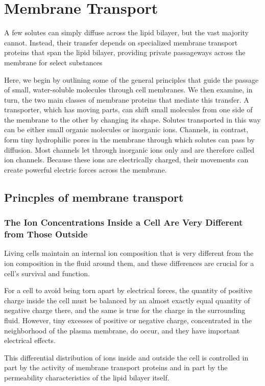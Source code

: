 \chapter{Membrane Transport}

A few solutes can simply diffuse across the lipid bilayer, but
the vast majority cannot. Instead, their transfer depends on specialized
membrane transport proteins that span the lipid bilayer, providing
private passageways across the membrane for select substances

Here, we begin by outlining some of the general principles that guide the passage
of small, water-soluble molecules through cell membranes. We then
examine, in turn, the two main classes of membrane proteins that mediate
this transfer. A transporter, which has moving parts, can shift small
molecules from one side of the membrane to the other by changing its
shape. Solutes transported in this way can be either small organic molecules
or inorganic ions. Channels, in contrast, form tiny hydrophilic pores
in the membrane through which solutes can pass by diffusion. Most channels
let through inorganic ions only and are therefore called ion channels.
Because these ions are electrically charged, their movements can create
powerful electric forces across the membrane.

\section{Princples of membrane transport}

\subsection{The Ion Concentrations Inside a Cell Are Very Different from Those Outside}

Living cells maintain an internal ion composition that is very different
from the ion composition in the fluid around them, and these differences
are crucial for a cell’s survival and function.

For a cell to avoid being torn apart by electrical forces, the quantity of positive charge inside the
cell must be balanced by an almost exactly equal quantity of negative
charge there, and the same is true for the charge in the surrounding fluid.
However, tiny excesses of positive or negative charge, concentrated in
the neighborhood of the plasma membrane, do occur, and they have
important electrical effects.

This differential distribution of ions inside and outside the cell is controlled
in part by the activity of membrane transport proteins and in part by the
permeability characteristics of the lipid bilayer itself.

